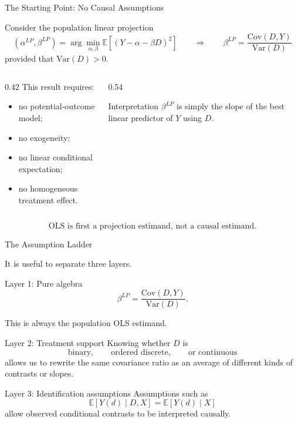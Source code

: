 \documentclass[aspectratio=169,11pt]{beamer}
\begin{document}
\begin{frame}{The Starting Point: No Causal Assumptions}
\small

Consider the population linear projection
\[
(\alpha^{LP},\beta^{LP})
=
\arg\min_{\alpha,\beta}
\mathbb{E}\left[(Y-\alpha-\beta D)^2\right]
\qquad\Longrightarrow\qquad
\boxed{
\beta^{LP}
=
\frac{\mathrm{Cov}(D,Y)}{\mathrm{Var}(D)}
}
\]
provided that \(\mathrm{Var}(D)>0\).

\medskip

\begin{columns}[T]
\begin{column}{0.42\textwidth}
This result requires:
\begin{itemize}
    \item no potential-outcome model;
    \item no exogeneity;
    \item no linear conditional expectation;
    \item no homogeneous treatment effect.
\end{itemize}
\end{column}
\begin{column}{0.54\textwidth}
\begin{block}{Interpretation}
\(\beta^{LP}\) is simply the slope of the best linear predictor of
\(Y\) using \(D\).
\end{block}
\end{column}
\end{columns}

\medskip

\[
\boxed{
\text{OLS is first a projection estimand, not a causal estimand.}
}
\]

\end{frame}


\begin{frame}{The Assumption Ladder}
\small

It is useful to separate three layers.

\begin{block}{Layer 1: Pure algebra}
\[
\beta^{LP}
=
\frac{\mathrm{Cov}(D,Y)}
{\mathrm{Var}(D)}.
\]

This is always the population OLS estimand.
\end{block}

\begin{block}{Layer 2: Treatment support}
Knowing whether \(D\) is
\[
\text{binary},\qquad
\text{ordered discrete},\qquad
\text{or continuous}
\]
allows us to rewrite the same covariance ratio as an average of
different kinds of contrasts or slopes.
\end{block}

\begin{block}{Layer 3: Identification assumptions}
Assumptions such as
\[
\mathbb{E}[Y(d)\mid D,X]
=
\mathbb{E}[Y(d)\mid X]
\]
allow observed conditional contrasts to be interpreted causally.
\end{block}

\end{frame}
\end{document}
